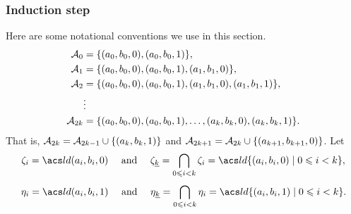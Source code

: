 \begin{comment}
\noindent \underline{\textbf{Subroutine \ld-2'}}\\[4pt]
To compute an \ld term operation for
$\{(a_0,b_0,1), (a_1, b_1, 0)\}$, obviously this is symmetric to
the situation handled in Subroutine LD2 and so the general algorithm
is the same.  Nonetheless, we include a listing of the computational 
steps required so that later we can easily refer to this special case 
of the general algorithm.
\begin{enumerate}[{\bf 1}]
\item Compute $\delta_1=\com{\thetaone}$;
\item form $C_1= \{b_0\}\times a_1/\delta_1 \leq \alg{A}\times\alg{A}$;
\item compute
      $S_1=\Sg^{\alg{A}\times \alg{A}} \{(a_0,a_1),(a_0,b_1),(b_0,b_1)\}$;
\item find a term operation $t$ of $\alg{A}$ satisfying
\[t^{\alg{A}\times\alg{A}}((a_0,a_1),(a_0,b_1),(b_0,b_1)) =
 (t^{\alg{A}}(a_0,a_0,b_0), t^{\alg{A}}(a_1,b_1,b_1)) \in C_1 \cap S_1.\]
\end{enumerate}
Then $t$ is an \ld term operation for
$\{(a_0, b_0, 1), (a_1, b_1, 0)\}$.
\end{comment}


\subsubsection{Induction step}
\label{sec:induct}
Here are some notational conventions we use in this section.
\begin{align*}
\mathcal{A}_0 &= \{(a_0, b_0, 0), (a_0, b_0, 1)\},\\
\mathcal{A}_1 &= \{(a_0, b_0, 0), (a_0, b_0, 1), (a_1,b_1,0)\},\\
\mathcal{A}_2 &= \{(a_0, b_0, 0), (a_0, b_0, 1), (a_1,b_1,0), (a_1,b_1,1)\},\\
&\vdots\\
\mathcal{A}_{2k} &= \{(a_0, b_0, 0), (a_0, b_0, 1), \dots, (a_k,b_k,0), (a_k,b_k,1)\}.
\end{align*}
That is, 
$\mathcal{A}_{2k} = \mathcal{A}_{2k-1} \cup \{(a_k,b_k,1)\}$ and
$\mathcal{A}_{2k+1} = \mathcal{A}_{2k} \cup \{(a_{k+1},b_{k+1},0)\}$.
Let
\[
  \zeta_i = \ld(a_i, b_i, 0) \quad \text{ and } \quad
  \zeta_{\kk} = \bigcap_{0\leq i < k}\zeta_i 
=\ld \{(a_i, b_i, 0) \mid 0\leq i<k\},
  \]
\[  \eta_i = \ld(a_i, b_i, 1)
   \quad \text{ and } \quad
  \eta_{\kk} = \bigcap_{0\leq i < k}\eta_i
=\ld \{(a_i, b_i, 1) \mid 0\leq i<k\}.
\]

